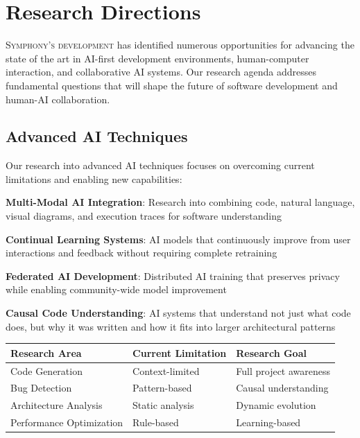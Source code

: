 
\section*{Research Directions}

\lettrine{S}{ymphony's development} has identified numerous opportunities for advancing the state of the art in AI-first development environments, human-computer interaction, and collaborative AI systems. Our research agenda addresses fundamental questions that will shape the future of software development and human-AI collaboration.

\subsection*{Advanced AI Techniques}

Our research into advanced AI techniques focuses on overcoming current limitations and enabling new capabilities:

\begin{expandedlist}
    \item \textbf{Multi-Modal AI Integration}: Research into combining code, natural language, visual diagrams, and execution traces for software understanding
    \item \textbf{Continual Learning Systems}: AI models that continuously improve from user interactions and feedback without requiring complete retraining
    \item \textbf{Federated AI Development}: Distributed AI training that preserves privacy while enabling community-wide model improvement
    \item \textbf{Causal Code Understanding}: AI systems that understand not just what code does, but why it was written and how it fits into larger architectural patterns
\end{expandedlist}

\begin{center}
\begin{tabular}{@{}lll@{}}
\toprule
\textbf{Research Area} & \textbf{Current Limitation} & \textbf{Research Goal} \\
\midrule
Code Generation & Context-limited & Full project awareness \\
Bug Detection & Pattern-based & Causal understanding \\
Architecture Analysis & Static analysis & Dynamic evolution \\
Performance Optimization & Rule-based & Learning-based \\
\bottomrule
\end{tabular}
\end{center}

